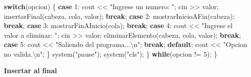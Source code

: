\documentclass[
  11pt,
  a4paper,
  DIV=11,
  numbers=noendperiod]{scrreprt}
\newenvironment{Shaded}{\begin{snugshade}}{\end{snugshade}}
\newcommand{\ControlFlowTok}[1]{\textcolor[rgb]{0.00,0.23,0.31}{\textbf{#1}}}
\newcommand{\DecValTok}[1]{\textcolor[rgb]{0.68,0.00,0.00}{#1}}
\newcommand{\NormalTok}[1]{\textcolor[rgb]{0.00,0.23,0.31}{#1}}
\newcommand{\OperatorTok}[1]{\textcolor[rgb]{0.37,0.37,0.37}{#1}}
\newcommand{\SpecialCharTok}[1]{\textcolor[rgb]{0.37,0.37,0.37}{#1}}
\newcommand{\StringTok}[1]{\textcolor[rgb]{0.13,0.47,0.30}{#1}}
\begin{document}
\begin{Shaded}
\begin{Highlighting}[]
        \ControlFlowTok{switch}\OperatorTok{(}\NormalTok{opcion}\OperatorTok{)} \OperatorTok{\{}
            \ControlFlowTok{case} \DecValTok{1}\OperatorTok{:}
\NormalTok{                cout }\OperatorTok{\textless{}\textless{}} \StringTok{"Ingrese un numero: "}\OperatorTok{;}
\NormalTok{                cin }\OperatorTok{\textgreater{}\textgreater{}}\NormalTok{ valor}\OperatorTok{;}
\NormalTok{                insertarFinal}\OperatorTok{(}\NormalTok{cabeza}\OperatorTok{,}\NormalTok{ cola}\OperatorTok{,}\NormalTok{ valor}\OperatorTok{);}
                \ControlFlowTok{break}\OperatorTok{;}
            \ControlFlowTok{case} \DecValTok{2}\OperatorTok{:}
\NormalTok{                mostrarInicioAFin}\OperatorTok{(}\NormalTok{cabeza}\OperatorTok{);}
                \ControlFlowTok{break}\OperatorTok{;}
            \ControlFlowTok{case} \DecValTok{3}\OperatorTok{:}
\NormalTok{                mostrarFinAInicio}\OperatorTok{(}\NormalTok{cola}\OperatorTok{);}
                \ControlFlowTok{break}\OperatorTok{;}
            \ControlFlowTok{case} \DecValTok{4}\OperatorTok{:}
\NormalTok{                cout }\OperatorTok{\textless{}\textless{}} \StringTok{"Ingrese el valor a eliminar: "}\OperatorTok{;}
\NormalTok{                cin }\OperatorTok{\textgreater{}\textgreater{}}\NormalTok{ valor}\OperatorTok{;}
\NormalTok{                eliminarElemento}\OperatorTok{(}\NormalTok{cabeza}\OperatorTok{,}\NormalTok{ cola}\OperatorTok{,}\NormalTok{ valor}\OperatorTok{);}
                \ControlFlowTok{break}\OperatorTok{;}
            \ControlFlowTok{case} \DecValTok{5}\OperatorTok{:}
\NormalTok{                cout }\OperatorTok{\textless{}\textless{}} \StringTok{"Saliendo del programa...}\SpecialCharTok{\textbackslash{}n}\StringTok{"}\OperatorTok{;}
                \ControlFlowTok{break}\OperatorTok{;}
            \ControlFlowTok{default}\OperatorTok{:}
\NormalTok{                cout }\OperatorTok{\textless{}\textless{}} \StringTok{"Opcion no valida.}\SpecialCharTok{\textbackslash{}n}\StringTok{"}\OperatorTok{;}
        \OperatorTok{\}}
\NormalTok{        system}\OperatorTok{(}\StringTok{"pause"}\OperatorTok{);}
\NormalTok{        system}\OperatorTok{(}\StringTok{"cls"}\OperatorTok{);}
    \OperatorTok{\}} \ControlFlowTok{while}\OperatorTok{(}\NormalTok{opcion }\OperatorTok{!=} \DecValTok{5}\OperatorTok{);}
\OperatorTok{\}}
\end{Highlighting}
\end{Shaded}

\textbf{Insertar al final}
\end{document}
